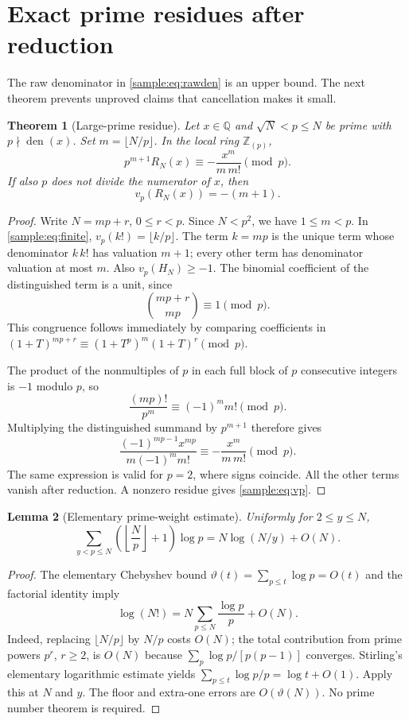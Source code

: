 \documentclass[11pt,a4paper]{article}
\newcommand{\Q}{\mathbb Q}
\newcommand{\Z}{\mathbb Z}
\DeclareMathOperator{\den}{den}
\newtheorem{theorem}{Theorem}[section]
\newtheorem{lemma}[theorem]{Lemma}
\theoremstyle{definition}
\theoremstyle{remark}
\numberwithin{equation}{section}
\begin{document}
\section{Exact prime residues after reduction}
\label{sample:sec:prime}
The raw denominator in \eqref{sample:eq:rawden} is an upper bound. The next
theorem prevents unproved claims that cancellation makes it small.

\begin{theorem}[Large-prime residue]\label{sample:thm:residue}
Let $x\in\Q$ and $\sqrt N<p\le N$ be prime with $p\nmid\den(x)$.
Set $m=\lfloor N/p\rfloor$. In the local ring $\Z_{(p)}$,
\begin{equation}\label{sample:eq:residue}
p^{m+1}R_N(x)\equiv-\frac{x^m}{m\,m!}\pmod p.
\end{equation}
If also $p$ does not divide the numerator of $x$, then
\begin{equation}\label{sample:eq:vp}
v_p(R_N(x))=-(m+1).
\end{equation}
\end{theorem}
\begin{proof}
Write $N=mp+r$, $0\le r<p$. Since $N<p^2$, we have $1\le m<p$.
In \eqref{sample:eq:finite}, $v_p(k!)=\lfloor k/p\rfloor$.
The term $k=mp$ is the unique term whose denominator $k\,k!$ has
valuation $m+1$; every other term has denominator valuation at most $m$.
Also $v_p(H_N)\ge-1$. The binomial coefficient of the distinguished term
is a unit, since
\[
\binom{mp+r}{mp}\equiv1\pmod p.
\]
This congruence follows immediately by comparing coefficients in
$(1+T)^{mp+r}\equiv(1+T^p)^m(1+T)^r\pmod p$.

The product of the nonmultiples of $p$ in each full block of $p$
consecutive integers is $-1$ modulo $p$, so
\[
\frac{(mp)!}{p^m}\equiv(-1)^m m!\pmod p.
\]
Multiplying the distinguished summand by $p^{m+1}$ therefore gives
\[
\frac{(-1)^{mp-1}x^{mp}}{m(-1)^m m!}
\equiv-\frac{x^m}{m\,m!}\pmod p.
\]
The same expression is valid for $p=2$, where signs coincide.
All the other terms vanish after reduction. A nonzero residue gives
\eqref{sample:eq:vp}.
\end{proof}

\begin{lemma}[Elementary prime-weight estimate]\label{sample:lem:primeweight}
Uniformly for $2\le y\le N$,
\begin{equation}\label{sample:eq:primeweight}
\sum_{y<p\le N}\left(\left\lfloor\frac Np\right\rfloor+1\right)\log p
=N\log(N/y)+O(N).
\end{equation}
\end{lemma}
\begin{proof}
The elementary Chebyshev bound $\vartheta(t)=\sum_{p\le t}\log p=O(t)$
and the factorial identity imply
\[
\log(N!)=N\sum_{p\le N}\frac{\log p}{p}+O(N).
\]
Indeed, replacing $\lfloor N/p\rfloor$ by $N/p$ costs $O(N)$;
the total contribution from prime powers $p^r$, $r\ge2$, is $O(N)$
because $\sum_p\log p/[p(p-1)]$ converges.
Stirling's elementary logarithmic estimate yields
$\sum_{p\le t}\log p/p=\log t+O(1)$.
Apply this at $N$ and $y$. The floor and extra-one errors are
$O(\vartheta(N))$. No prime number theorem is required.
\end{proof}
\end{document}

